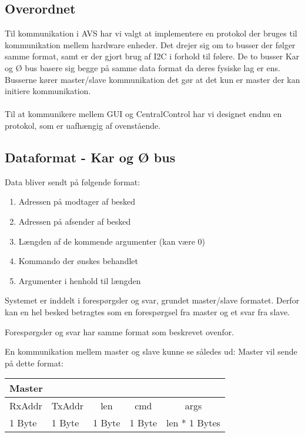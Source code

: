 
\subsection{Overordnet}
Til kommunikation i AVS har vi valgt at implementere en protokol der bruges til kommunikation mellem hardware enheder.
Det drejer sig om to busser der følger samme format, samt er der gjort brug af I2C i forhold til følere. De to busser Kar og Ø bus basere sig begge på samme data format da deres fysiske lag er ens. Busserne kører master/slave kommunikation det gør at det kun er master der kan initiere kommunikation.\\\\

Til at kommunikere mellem GUI og CentralControl har vi designet endnu en protokol, som er uafhængig af ovenstående.

\subsection{Dataformat - Kar og Ø bus} 
Data bliver sendt på følgende format:

\begin{enumerate}
\item Adressen på modtager af besked
\item Adressen på afsender af besked
\item Længden af de kommende argumenter (kan være 0)
\item Kommando der ønskes behandlet
\item Argumenter i henhold til længden
\end{enumerate}

Systemet er inddelt i forespørgsler og svar, grundet master/slave formatet. Derfor kan en hel besked betragtes som en forespørgsel fra master og et svar fra slave.

Forespørgsler og svar har samme format som beskrevet ovenfor.

En kommunikation mellem master og slave kunne se således ud:
Master vil sende på dette format:
\begin{table}[H]
\setlength{\parindent}{12pt}
\begin{tabular}{|l|l|c|c|c|}\hline
\multicolumn{5}{|l|}{Master\cellcolor[gray]{0.9}}\\\hline
RxAddr & TxAddr & len & cmd & args \\\hline
1 Byte & 1 Byte & 1 Byte & 1 Byte & len * 1 Bytes \\\hline 
\end{tabular}
\end{table}


